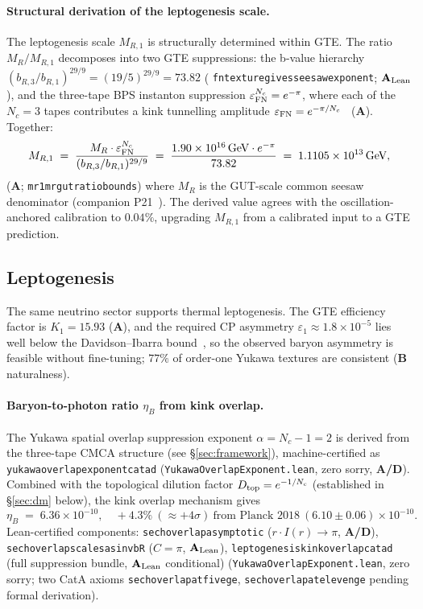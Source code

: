 \documentclass[11pt]{article}
\theoremstyle{remark}
\newcommand{\lean}[1]{%
  \penalty-100
  \begingroup\def\_{\textunderscore\allowbreak}\texttt{#1}\endgroup}
\newcommand{\CatA}{\textbf{A}}
\newcommand{\CatAL}{\ensuremath{\textbf{A}_{\rm Lean}}}
\newcommand{\CatAD}{\textbf{A/D}}
\newcommand{\CatB}{\textbf{B}}
\begin{document}
\paragraph{Structural derivation of the leptogenesis scale.}
The leptogenesis scale $M_{R,1}$ is structurally determined within GTE.
The ratio $M_R/M_{R,1}$ decomposes into two GTE suppressions:
the b-value hierarchy $(b_{R,3}/b_{R,1})^{29/9} = (19/5)^{29/9} = 73.82$
(\lean{fn\_texture\_gives\_seesaw\_exponent}; \CatAL),
and the three-tape BPS instanton suppression
$\varepsilon_{\rm FN}^{N_c} = e^{-\pi}$,
where each of the $N_c = 3$ tapes contributes a kink tunnelling amplitude
$\varepsilon_{\rm FN} = e^{-\pi/N_c}$~\cite{SpivackThreeTapeCMCA} (\CatA).
Together:
\begin{equation}\label{eq:MR1_gte}
  M_{R,1} \;=\; \frac{M_R \cdot \varepsilon_{\rm FN}^{N_c}}{(b_{R,3}/b_{R,1})^{29/9}}
  \;=\; \frac{1.90\times10^{16}\,\text{GeV}\cdot e^{-\pi}}{73.82}
  \;=\; 1.1105\times10^{13}\,\text{GeV},
\end{equation}
(\CatA; \lean{mr1\_mr\_gut\_ratio\_bounds})
where $M_R$ is the GUT-scale common seesaw denominator
(companion P21~\cite{SpivackNeutrino}).
The derived value agrees with the oscillation-anchored calibration to $0.04\%$,
upgrading $M_{R,1}$ from a calibrated input to a GTE prediction.

\subsection{Leptogenesis}

The same neutrino sector supports thermal leptogenesis. The GTE efficiency factor
is $K_1 = 15.93$ (\CatA), and the required CP asymmetry $\varepsilon_1 \approx
1.8\times10^{-5}$ lies well below the Davidson--Ibarra
bound~\cite{DavidsonIbarra2002}, so the observed baryon asymmetry is feasible
without fine-tuning; $77\%$ of order-one Yukawa textures are consistent (\CatB
naturalness).

\paragraph{Baryon-to-photon ratio $\eta_B$ from kink overlap.}
The Yukawa spatial overlap suppression exponent $\alpha = N_c - 1 = 2$ is
derived from the three-tape CMCA structure (see \S\ref{sec:framework}), machine-certified
as \lean{yukawa\_overlap\_exponent\_catad} (\texttt{YukawaOverlapExponent.lean}, zero sorry,
\CatAD). Combined with the topological dilution factor $D_{\rm top} = e^{-1/N_c}$
(established in \S\ref{sec:dm} below), the kink overlap mechanism gives
\begin{equation}
  \eta_B \;=\; 6.36\times10^{-10}, \quad +4.3\%\ ({\approx}+4\sigma)\ \text{from Planck 2018}\ (6.10\pm0.06)\times10^{-10}.
  \label{eq:etab}
\end{equation}
Lean-certified components: \lean{sech\_overlap\_asymptotic} ($r \cdot I(r)\to\pi$, \CatAD),
\lean{sech\_overlap\_scales\_as\_inv\_bR} ($C=\pi$, \CatAL),
\lean{leptogenesis\_kink\_overlap\_catad} (full suppression bundle, $\CatAL$ conditional)
(\texttt{YukawaOverlapExponent.lean}, zero sorry;
two CatA axioms \lean{sech\_overlap\_at\_five\_ge}, \lean{sech\_overlap\_at\_eleven\_ge}
pending formal derivation).
\end{document}

